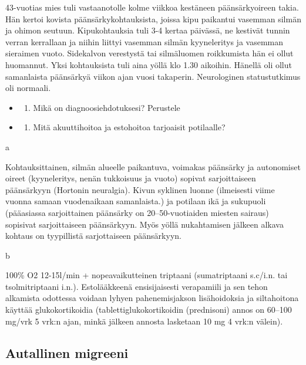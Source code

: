 \documentclass[
]{book}
\providecommand{\tightlist}{%
  \setlength{\itemsep}{0pt}\setlength{\parskip}{0pt}}
\begin{document}
43-vuotias mies tuli vastaanotolle kolme viikkoa kestäneen päänsärkyoireen takia. Hän kertoi kovista päänsärkykohtauksista, joissa kipu paikantui vasemman silmän ja ohimon seutuun. Kipukohtauksia tuli 3-4 kertaa päivässä, ne kestivät tunnin verran kerrallaan ja niihin liittyi vasemman silmän kyyneleritys ja vasemman sieraimen vuoto. Sidekalvon verestystä tai silmäluomen roikkumista hän ei ollut huomannut. Yksi kohtauksista tuli aina yöllä klo 1.30 aikoihin. Hänellä oli ollut samanlaista päänsärkyä viikon ajan vuosi takaperin. Neurologinen statustutkimus oli normaali.

\begin{itemize}
\tightlist
\item
  \begin{enumerate}
  \def\labelenumi{\alph{enumi}.}
  \tightlist
  \item
    Mikä on diagnoosiehdotuksesi? Perustele
  \end{enumerate}
\item
  \begin{enumerate}
  \def\labelenumi{\alph{enumi}.}
  \setcounter{enumi}{1}
  \tightlist
  \item
    Mitä akuuttihoitoa ja estohoitoa tarjoaisit potilaalle?
  \end{enumerate}
\end{itemize}

a

Kohtauksittainen, silmän alueelle paikantuva, voimakas päänsärky ja autonomiset oireet (kyyneleritys, nenän tukkoisuus ja vuoto) sopivat sarjoittaiseen päänsärkyyn (Hortonin neuralgia). Kivun syklinen luonne (ilmeisesti viime vuonna samaan vuodenaikaan samanlaista.) ja potilaan ikä ja sukupuoli (pääasiassa sarjoittainen päänsärky on 20--50-vuotiaiden miesten sairaus) sopisivat sarjoittaiseen päänsärkyyn. Myös yöllä nukahtamisen jälkeen alkava kohtaus on tyypillistä sarjottaiseen päänsärkyyn.

b

100\% O2 12-15l/min + nopeavaikutteinen triptaani (sumatriptaani s.c/i.n. tai tsolmitriptaani i.n.). Estolääkkeenä ensisijaisesti verapamiili ja sen tehon alkamista odottessa voidaan lyhyen pahenemisjakson lisähoidoksia ja siltahoitona käyttää glukokortikoidia (tablettiglukokortikoidin (prednisoni) annos on 60--100 mg/vrk 5 vrk:n ajan, minkä jälkeen annosta lasketaan 10 mg 4 vrk:n välein).

\subsection{Autallinen migreeni}\label{autallinen-migreeni}
\end{document}
